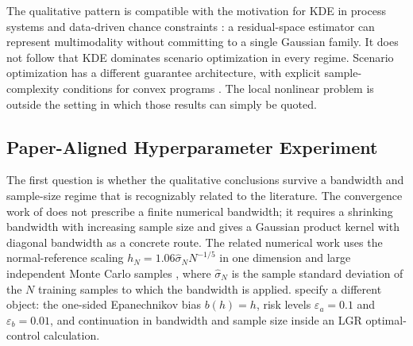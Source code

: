 The qualitative pattern is compatible with the motivation for KDE in process systems and data-driven chance constraints \citep{calfa2015}: a residual-space estimator can represent multimodality without committing to a single Gaussian family. It does not follow that KDE dominates scenario optimization in every regime. Scenario optimization has a different guarantee architecture, with explicit sample-complexity conditions for convex programs \citep{calafiore2006,campi2008}. The local nonlinear problem is outside the setting in which those results can simply be quoted.

\subsection{Paper-Aligned Hyperparameter Experiment}

The first question is whether the qualitative conclusions survive a bandwidth and sample-size regime that is recognizably related to the literature. The convergence work of \citet{schuster2025} does not prescribe a finite numerical bandwidth; it requires a shrinking bandwidth with increasing sample size and gives a Gaussian product kernel with diagonal bandwidth as a concrete route. The related numerical work uses the normal-reference scaling $h_N=1.06\hat\sigma_NN^{-1/5}$ in one dimension and large independent Monte Carlo samples \citep{schuster2022}, where $\hat\sigma_N$ is the sample standard deviation of the $N$ training samples to which the bandwidth is applied. \citet{keil2020,keil2021,keil2021warm} specify a different object: the one-sided Epanechnikov bias $b(h)=h$, risk levels $\varepsilon_a=0.1$ and $\varepsilon_b=0.01$, and continuation in bandwidth and sample size inside an LGR optimal-control calculation.

